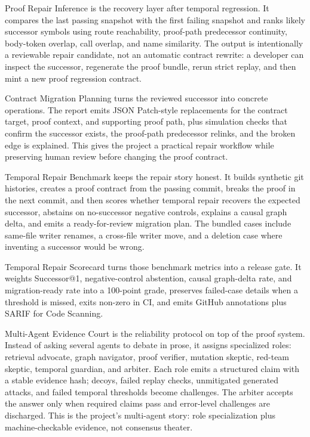 \documentclass[UTF8,12pt,openany]{ctexbook}
\begin{document}
Proof Repair Inference is the recovery layer after temporal regression. It compares the last passing snapshot with the first failing snapshot and ranks likely successor symbols using route reachability, proof-path predecessor continuity, body-token overlap, call overlap, and name similarity. The output is intentionally a reviewable repair candidate, not an automatic contract rewrite: a developer can inspect the successor, regenerate the proof bundle, rerun strict replay, and then mint a new proof regression contract.\par

Contract Migration Planning turns the reviewed successor into concrete operations. The report emits JSON Patch-style replacements for the contract target, proof context, and supporting proof path, plus simulation checks that confirm the successor exists, the proof-path predecessor relinks, and the broken edge is explained. This gives the project a practical repair workflow while preserving human review before changing the proof contract.\par

Temporal Repair Benchmark keeps the repair story honest. It builds synthetic git histories, creates a proof contract from the passing commit, breaks the proof in the next commit, and then scores whether temporal repair recovers the expected successor, abstains on no-successor negative controls, explains a causal graph delta, and emits a ready-for-review migration plan. The bundled cases include same-file writer renames, a cross-file writer move, and a deletion case where inventing a successor would be wrong.\par

Temporal Repair Scorecard turns those benchmark metrics into a release gate. It weights Successor@1, negative-control abstention, causal graph-delta rate, and migration-ready rate into a 100-point grade, preserves failed-case details when a threshold is missed, exits non-zero in CI, and emits GitHub annotations plus SARIF for Code Scanning.\par

Multi-Agent Evidence Court is the reliability protocol on top of the proof system. Instead of asking several agents to debate in prose, it assigns specialized roles: retrieval advocate, graph navigator, proof verifier, mutation skeptic, red-team skeptic, temporal guardian, and arbiter. Each role emits a structured claim with a stable evidence hash; decoys, failed replay checks, unmitigated generated attacks, and failed temporal thresholds become challenges. The arbiter accepts the answer only when required claims pass and error-level challenges are discharged. This is the project's multi-agent story: role specialization plus machine-checkable evidence, not consensus theater.\par
\end{document}
